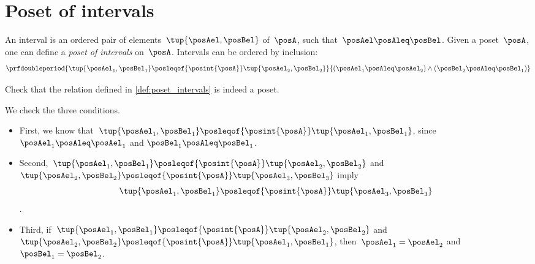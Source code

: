 
\section{Poset of intervals}
\begin{definition}
    \label{def:poset_intervals}
    An interval is an ordered pair of elements~$\tup{\posAel,\posBel}$ of~$\posA$, such that~$\posAel \posAleq \posBel$.
    Given a poset~$\posA$, one can define a \emph{poset of intervals} on~$\posA$.
    Intervals can be ordered by inclusion:
    \begin{equation}
        \prfdoubleperiod{
            \tup{\posAel_1,\posBel_1}
            \posleqof{\posint{\posA}}
            \tup{\posAel_2,\posBel_2}
        }{
            (\posAel_1\posAleq \posAel_2)\wedge (\posBel_2\posAleq \posBel_1)
        }
    \end{equation}
\end{definition}

\begin{exercise}
    Check that the relation defined in \cref{def:poset_intervals} is indeed a poset.
\end{exercise}
\begin{solution}
    We check the three conditions.
    \begin{itemize}
        \item First, we know that~$\tup{\posAel_1,\posBel_1}\posleqof{\posint{\posA}}\tup{\posAel_1,\posBel_1}$, since $\posAel_1\posAleq \posAel_1$ and $\posBel_1\posAleq \posBel_1$.
        \item Second,~$\tup{\posAel_1,\posBel_1}\posleqof{\posint{\posA}}\tup{\posAel_2,\posBel_2}$ and $\tup{\posAel_2,\posBel_2}\posleqof{\posint{\posA}}\tup{\posAel_3,\posBel_3}$ imply
              \begin{equation}
                  \tup{\posAel_1,\posBel_1}\posleqof{\posint{\posA}}\tup{\posAel_3,\posBel_3}
              \end{equation}.
        \item Third, if~$\tup{\posAel_1,\posBel_1}\posleqof{\posint{\posA}}\tup{\posAel_2,\posBel_2}$ and $\tup{\posAel_2,\posBel_2}\posleqof{\posint{\posA}}\tup{\posAel_1,\posBel_1}$, then~$\posAel_1=\posAel_2$ and~$\posBel_1=\posBel_2$.
    \end{itemize}
\end{solution}

